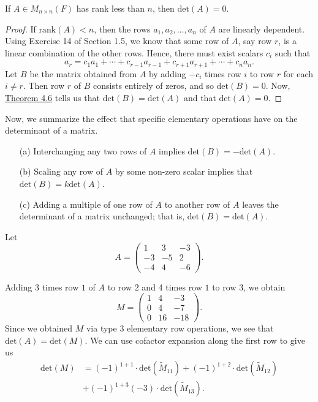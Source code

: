 \begin{corollary}
    If \( A \in {M}_{n \times n}(F) \) has rank less than \( n  \), then \( \text{det}(A) = 0  \).
\end{corollary}
\begin{proof}
If \( \text{rank}(A) < n  \), then the rows \( {a}_{1}, {a}_{2}, \dots, {a}_{n} \) of \( A  \) are linearly dependent. Using Exercise 14 of Section 1.5, we know that some row of \( A  \), say row \( r  \), is a linear combination of the other rows. Hence, there must exist scalars \( {c}_{i} \) such that
\[  {a}_{r} = {c}_{1} {a}_{1} + \cdots + {c}_{r-1} {a}_{r-1} + {c}_{r+1} {a}_{r+1} + \cdots + {c}_{n} {a}_{n}.  \]
Let \( B  \) be the matrix obtained from \( A  \) by adding \( - {c}_{i} \) times row \( i  \) to row \( r \) for each \( i \neq r  \). Then row \( r \) of \( B  \) consists entirely of zeros, and so \( \text{det}(B) = 0  \). Now, {\hyperref[Theorem 4.6]{Theorem 4.6}} tells us that \( \text{det}(B) = \text{det}(A) \) and that \( \text{det}(A)  = 0  \).
\end{proof}

Now, we summarize the effect that specific elementary operations have on the determinant of a matrix.
\begin{enumerate}
    \item[(a)] Interchanging any two rows of \( A  \) implies \( \text{det}(B) = - \text{det}(A) \).
    \item[(b)] Scaling any row of \( A \) by some non-zero scalar implies that \( \text{det}(B) = k \text{det}(A) \).
    \item[(c)] Adding a multiple of one row of \( A  \) to another row of \( A  \) leaves the determinant of a matrix unchanged; that is, \( \text{det}(B) = \text{det}(A) \).
\end{enumerate}

Let 
\[  A = \begin{pmatrix} 
    1 & 3 & -3 \\
    -3 & -5 & 2 \\
    -4 & 4 & -6
          \end{pmatrix}. \]

Adding \( 3  \) times row \( 1  \) of \( A  \) to row \( 2  \) and 4 times row \( 1  \) to row \( 3 \), we obtain 
\[  M = \begin{pmatrix} 
    1 & 4 & -3 \\
    0 & 4 & -7 \\
    0 & 16 & -18
          \end{pmatrix} . \]
Since we obtained \( M  \) via type 3 elementary row operations, we see that \( \text{det}(A) = \text{det}(M) \). We can use cofactor expansion along the first row to give us 
\begin{align*}
    \text{det}(M) &= (-1)^{1+1} \cdot \text{det}({\tilde{M}}_{11}) + (-1)^{1+2} \cdot \text{det}({\tilde{M}}_{12})  \\
                  &+ (-1)^{1+3} (-3) \cdot \text{det}({\tilde{M}}_{13}).
\end{align*}

